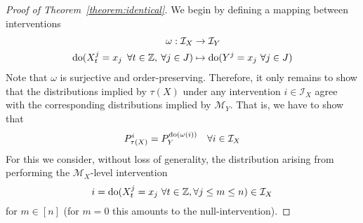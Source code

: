 \begin{proof}[Proof of Theorem~\ref{theorem:identical}]
We begin by defining a mapping between interventions
\begin{align*}
\omega : \mathcal{I}_X &\rightarrow \mathcal{I}_Y \\
\operatorname{do}(X_t^j= x_j \enspace \forall t \in \mathbb{Z}, \: \forall j \in J) & \mapsto \operatorname{do}(Y^j= x_j \ \forall j \in J)
\end{align*}
%
Note that $\omega$ is surjective and order-preserving.
Therefore, it only remains to show that the distributions implied by $\tau(X)$ under any intervention $i\in\mathcal{I}_X$ agree with the corresponding distributions implied by $\mathcal{M}_Y$.
That is, we have to show that
\[ P_{\tau(X)}^{i} = P_{Y}^{\operatorname{do}(\omega(i))} \quad \forall i\in\mathcal{I}_X \]
%
For this we consider, without loss of generality, the distribution arising from performing the $\mathcal{M}_X$-level intervention
\[ i = \operatorname{do}(X_t^j=x_j\ \forall t\in\mathbb{Z},\forall j \leq m \leq n) \in \mathcal{I}_X \]
for $m \in [n]$ (for $m=0$ this amounts to the null-intervention).


\end{proof}
